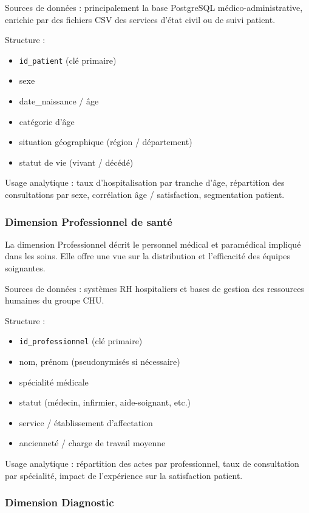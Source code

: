 \documentclass[12pt,a4paper]{article}
\begin{document}
Sources de données : principalement la base PostgreSQL médico-administrative, enrichie par des fichiers CSV des services d’état civil ou de suivi patient.

Structure :
\begin{itemize}
    \item \texttt{id\_patient} (clé primaire)
    \item sexe
    \item date\_naissance / âge
    \item catégorie d’âge
    \item situation géographique (région / département)
    \item statut de vie (vivant / décédé)
\end{itemize}

Usage analytique : taux d’hospitalisation par tranche d’âge, répartition des consultations par sexe, corrélation âge / satisfaction, segmentation patient.

\subsubsection{Dimension Professionnel de santé}

La dimension Professionnel décrit le personnel médical et paramédical impliqué dans les soins. Elle offre une vue sur la distribution et l’efficacité des équipes soignantes.

Sources de données : systèmes RH hospitaliers et bases de gestion des ressources humaines du groupe CHU.

Structure :
\begin{itemize}
    \item \texttt{id\_professionnel} (clé primaire)
    \item nom, prénom (pseudonymisés si nécessaire)
    \item spécialité médicale
    \item statut (médecin, infirmier, aide-soignant, etc.)
    \item service / établissement d’affectation
    \item ancienneté / charge de travail moyenne
\end{itemize}

Usage analytique : répartition des actes par professionnel, taux de consultation par spécialité, impact de l’expérience sur la satisfaction patient.

\subsubsection{Dimension Diagnostic}
\end{document}
